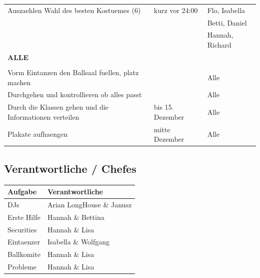 \documentclass[12pt]{article}
\begin{document}
\begin{tabular}{ | p{} | p{} |  p{} |}
Auszaehlen Wahl des besten Kostuemes (6) & kurz vor 24:00 & Flo, Isabella  \\ 
  &  & Betti, Daniel  \\ 
  &  & Hannah, Richard \\ \hline
\textbf{ALLE} &  &  \\ 
  &  &  \\ \hline
Vorm Eintanzen den Ballsaal fuellen, platz machen &  & Alle  \\ \hline
Durchgehen und kontrollieren ob alles passt &  & Alle  \\ \hline
Durch die Klassen gehen und die Informationen verteilen & bis 15. Dezember &  Alle\\ \hline
Plakate aufhaengen & mitte Dezember & Alle  \\ \hline

\hline
\end{tabular}
  
\subsection{Verantwortliche / Chefes}

\begin{tabular}{ | p{} | p{}  |}
    \hline
\textbf{Aufgabe} & \textbf{Verantwortliche}  \\ 
    \hline 
    \hline
  
DJs  & Arian LongHouse \& Janusz\\ \hline
Erste Hilfe & Hannah  \& Bettina \\ \hline
Securities  & Hannah  \& Lisa \\ \hline
Eintaenzer & Isabella  \& Wolfgang\\ \hline
Ballkomite &  Hannah  \& Lisa \\ \hline
Probleme &  Hannah  \& Lisa \\ \hline
  \end{tabular}
\end{document}
